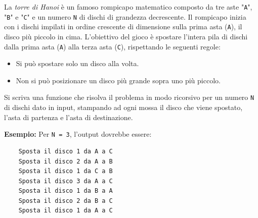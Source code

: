 \begin{Exercise}[label={ex:hanoi}]
    La \emph{torre di Hanoi} è un famoso rompicapo matematico composto da tre aste "\texttt{A}", "\texttt{B}" e "\texttt{C}" e un numero \texttt{N} di dischi di grandezza decrescente.
    Il rompicapo inizia con i dischi impilati in ordine crescente di dimensione sulla prima asta (\texttt{A}), il disco più piccolo in cima.
    L'obiettivo del gioco è spostare l'intera pila di dischi dalla prima asta (\texttt{A}) alla terza asta (\texttt{C}), rispettando le seguenti regole:
    \begin{itemize}
        \item Si può spostare solo un disco alla volta.
        \item Non si può posizionare un disco più grande sopra uno più piccolo.
    \end{itemize}
    Si scriva una funzione che risolva il problema in modo ricorsivo per un numero \texttt{N} di dischi dato in input,
    stampando ad ogni mossa il disco che viene spostato, l'asta di partenza e l'asta di destinazione.

    \textbf{Esempio:} Per \texttt{N = 3}, l'output dovrebbe essere:
    \begin{verbatim}
    Sposta il disco 1 da A a C
    Sposta il disco 2 da A a B
    Sposta il disco 1 da C a B
    Sposta il disco 3 da A a C
    Sposta il disco 1 da B a A
    Sposta il disco 2 da B a C
    Sposta il disco 1 da A a C
    \end{verbatim}
\end{Exercise}

\begin{Answer}[ref={ex:hanoi}]
  	
\end{Answer}